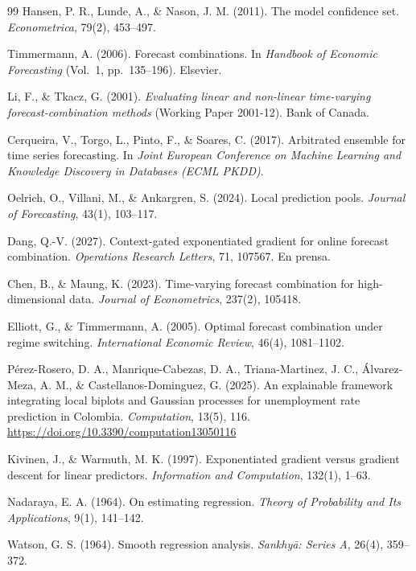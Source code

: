 \documentclass[11pt]{article}
\begin{document}
\begin{thebibliography}{99}
 Hansen, P. R., Lunde, A., \& Nason, J. M. (2011). The model confidence set. \textit{Econometrica}, 79(2), 453--497.

 Timmermann, A. (2006). Forecast combinations. In \textit{Handbook of Economic Forecasting} (Vol.\ 1, pp.\ 135--196). Elsevier.

 Li, F., \& Tkacz, G. (2001). \textit{Evaluating linear and non-linear time-varying forecast-combination methods} (Working Paper 2001-12). Bank of Canada.

 Cerqueira, V., Torgo, L., Pinto, F., \& Soares, C. (2017). Arbitrated ensemble for time series forecasting. In \textit{Joint European Conference on Machine Learning and Knowledge Discovery in Databases (ECML PKDD)}.

 Oelrich, O., Villani, M., \& Ankargren, S. (2024). Local prediction pools. \textit{Journal of Forecasting}, 43(1), 103--117.

 Dang, Q.-V. (2027). Context-gated exponentiated gradient for online forecast combination. \textit{Operations Research Letters}, 71, 107567. En prensa.

 Chen, B., \& Maung, K. (2023). Time-varying forecast combination for high-dimensional data. \textit{Journal of Econometrics}, 237(2), 105418.

 Elliott, G., \& Timmermann, A. (2005). Optimal forecast combination under regime switching. \textit{International Economic Review}, 46(4), 1081--1102.

 Pérez-Rosero, D. A., Manrique-Cabezas, D. A., Triana-Martinez, J. C., Álvarez-Meza, A. M., \& Castellanos-Dominguez, G. (2025). An explainable framework integrating local biplots and Gaussian processes for unemployment rate prediction in Colombia. \textit{Computation}, 13(5), 116. \url{https://doi.org/10.3390/computation13050116}

 Kivinen, J., \& Warmuth, M. K. (1997). Exponentiated gradient versus gradient descent for linear predictors. \textit{Information and Computation}, 132(1), 1--63.

 Nadaraya, E. A. (1964). On estimating regression. \textit{Theory of Probability and Its Applications}, 9(1), 141--142.

 Watson, G. S. (1964). Smooth regression analysis. \textit{Sankhy\={a}: Series A}, 26(4), 359--372.


\end{thebibliography}
\end{document}
